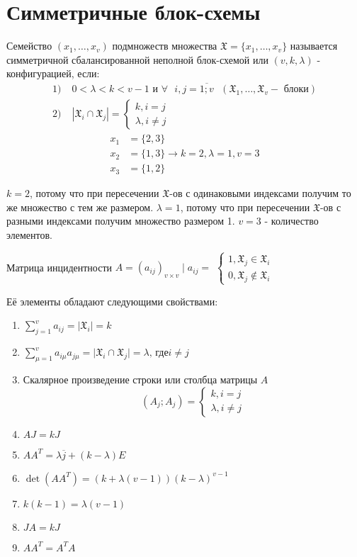 \section{Симметричные блок-схемы}

\opr Семейство $(x_1, \dots, x_v)$ подмножеств множества $\mathfrak{X} = \lbrace x_1, \dots, x_v\rbrace$
называется симметричной сбалансированной неполной блок-схемой или $(v, k , \lambda)$ - конфигурацией, если:
\begin{align*}
	1)\;&0 < \lambda < k < v - 1 \text{ и } \forall \text{ } i, j  = \overline{1;v} \text{ }
	(\mathfrak{X}_1, \dots, \mathfrak{X}_v - \text{ блоки})\\
	2)\;&|\mathfrak{X}_i \cap \mathfrak{X}_j| = 
	\begin{cases}
		k, i = j \\
		\lambda, i \neq j
	\end{cases}
\end{align*}
\examplei
\begin{align*}
	x_1 &= \lbrace 2, 3 \rbrace \\
	x_2 &= \lbrace 1, 3 \rbrace \rightarrow k = 2, \lambda = 1, v = 3\\
	x_3 &= \lbrace 1, 2 \rbrace
\end{align*}

\prim $k = 2$, потому что при пересечении $\mathfrak{X}$-ов с одинаковыми индексами получим то же множество с тем же размером.
$\lambda = 1$, потому что при пересечении $\mathfrak{X}$-ов с разными индексами получим множество размером 1.
$v = 3$ - количество элементов.

Матрица инцидентности $A = (a_{ij})_{v \times v} \mid a_{ij} = $
$\begin{cases}
	1, \mathfrak{X}_j \in \mathfrak{X}_i \\
	0, \mathfrak{X}_j \notin \mathfrak{X}_i
\end{cases}$

Её элементы обладают следующими свойствами:
\begin{enumerate}
	\item $\sum_{j=1}^v a_{ij} = \vert \mathfrak{X}_i \vert = k$
	\item $\sum_{\mu=1}^v a_{i\mu}a_{j\mu} = \vert \mathfrak{X}_i \cap \mathfrak{X}_j \vert = \lambda \text{, где} i\neq j$
	\item Скалярное произведение строки или столбца матрицы $A$
	\begin{equation*}
		(A_j; A_j) = 
		\begin{cases}
			k, i = j \\
			\lambda, i \neq j
		\end{cases}
	\end{equation*}
	\item $AJ = kJ$
	\item $AA^T = \lambda \overline{j} + (k - \lambda)E$
	\item $\det(AA^T) = (k + \lambda(v - 1))(k - \lambda)^{v - 1}$
	\item $k(k - 1) = \lambda(v - 1)$
	\item $JA = kJ$
	\item $AA^T = A^TA$
\end{enumerate}

